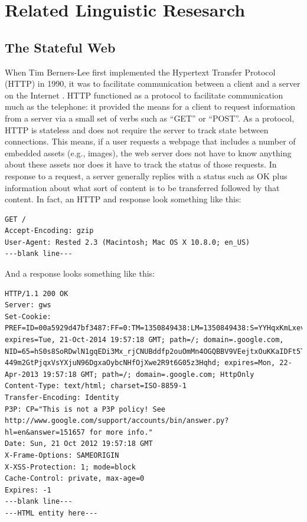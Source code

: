 \section{Related Linguistic Resesarch}
\label{relatedlinguisticresesarch}

\subsection{The Stateful Web}
\label{thestatefulweb}

When Tim Berners-Lee first implemented the Hypertext Transfer Protocol (HTTP) in 1990, it was to facilitate communication between a client and a server on the Internet  \citep{Thewebsiteofthew:vo}.  HTTP functioned as a protocol to facilitate communication much as the telephone: it provided the means for a client to request information from a server via a small set of verbs such as ``GET'' or ``POST''. As a protocol, HTTP is stateless and does not require the server to track state between connections. This means, if a user requests a webpage that includes a number of embedded assets (e.g., images), the web server does not have to know anything about these assets nor does it have to track the status of those requests. In response to a request, a server generally replies with a status such as OK plus information about what sort of content is to be transferred followed by that content. In fact, an HTTP and response look something like this:

\begin{lstlisting}[numbers=none]
GET /
Accept-Encoding: gzip
User-Agent: Rested 2.3 (Macintosh; Mac OS X 10.8.0; en_US) 
---blank line---
\end{lstlisting}

And a response looks something like this:

\begin{lstlisting}[numbers=none]
HTTP/1.1 200 OK
Server: gws
Set-Cookie: PREF=ID=00a5929d47bf3487:FF=0:TM=1350849438:LM=1350849438:S=YYHqxKmLxevdwbvo; expires=Tue, 21-Oct-2014 19:57:18 GMT; path=/; domain=.google.com, NID=65=hS0s8SoRDwlN1gqEDi3Mx_rjCNUBddfp2ouOmMn4OGQBBV9VEejtxOuKKaIDFt5TMyrBs0ZGBZ3BH-449m2GtPjqxVsYXjuN96DgxaOybcNHfOjXwe2R9t6G05z3Hqhd; expires=Mon, 22-Apr-2013 19:57:18 GMT; path=/; domain=.google.com; HttpOnly
Content-Type: text/html; charset=ISO-8859-1
Transfer-Encoding: Identity
P3P: CP="This is not a P3P policy! See http://www.google.com/support/accounts/bin/answer.py?hl=en&answer=151657 for more info."
Date: Sun, 21 Oct 2012 19:57:18 GMT
X-Frame-Options: SAMEORIGIN
X-XSS-Protection: 1; mode=block
Cache-Control: private, max-age=0
Expires: -1
---blank line---
---HTML entity here---
\end{lstlisting}

